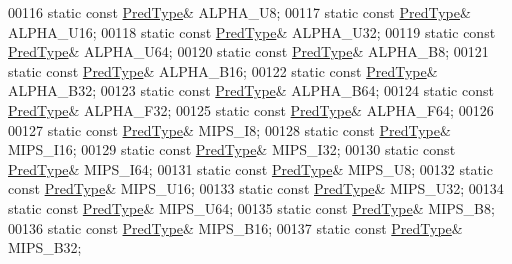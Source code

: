 \begin{DoxyCode}
00116         \textcolor{keyword}{static} \textcolor{keyword}{const} \hyperlink{class_h5_1_1_pred_type}{PredType}& ALPHA\_U8;
00117         \textcolor{keyword}{static} \textcolor{keyword}{const} \hyperlink{class_h5_1_1_pred_type}{PredType}& ALPHA\_U16;
00118         \textcolor{keyword}{static} \textcolor{keyword}{const} \hyperlink{class_h5_1_1_pred_type}{PredType}& ALPHA\_U32;
00119         \textcolor{keyword}{static} \textcolor{keyword}{const} \hyperlink{class_h5_1_1_pred_type}{PredType}& ALPHA\_U64;
00120         \textcolor{keyword}{static} \textcolor{keyword}{const} \hyperlink{class_h5_1_1_pred_type}{PredType}& ALPHA\_B8;
00121         \textcolor{keyword}{static} \textcolor{keyword}{const} \hyperlink{class_h5_1_1_pred_type}{PredType}& ALPHA\_B16;
00122         \textcolor{keyword}{static} \textcolor{keyword}{const} \hyperlink{class_h5_1_1_pred_type}{PredType}& ALPHA\_B32;
00123         \textcolor{keyword}{static} \textcolor{keyword}{const} \hyperlink{class_h5_1_1_pred_type}{PredType}& ALPHA\_B64;
00124         \textcolor{keyword}{static} \textcolor{keyword}{const} \hyperlink{class_h5_1_1_pred_type}{PredType}& ALPHA\_F32;
00125         \textcolor{keyword}{static} \textcolor{keyword}{const} \hyperlink{class_h5_1_1_pred_type}{PredType}& ALPHA\_F64;
00126 
00127         \textcolor{keyword}{static} \textcolor{keyword}{const} \hyperlink{class_h5_1_1_pred_type}{PredType}& MIPS\_I8;
00128         \textcolor{keyword}{static} \textcolor{keyword}{const} \hyperlink{class_h5_1_1_pred_type}{PredType}& MIPS\_I16;
00129         \textcolor{keyword}{static} \textcolor{keyword}{const} \hyperlink{class_h5_1_1_pred_type}{PredType}& MIPS\_I32;
00130         \textcolor{keyword}{static} \textcolor{keyword}{const} \hyperlink{class_h5_1_1_pred_type}{PredType}& MIPS\_I64;
00131         \textcolor{keyword}{static} \textcolor{keyword}{const} \hyperlink{class_h5_1_1_pred_type}{PredType}& MIPS\_U8;
00132         \textcolor{keyword}{static} \textcolor{keyword}{const} \hyperlink{class_h5_1_1_pred_type}{PredType}& MIPS\_U16;
00133         \textcolor{keyword}{static} \textcolor{keyword}{const} \hyperlink{class_h5_1_1_pred_type}{PredType}& MIPS\_U32;
00134         \textcolor{keyword}{static} \textcolor{keyword}{const} \hyperlink{class_h5_1_1_pred_type}{PredType}& MIPS\_U64;
00135         \textcolor{keyword}{static} \textcolor{keyword}{const} \hyperlink{class_h5_1_1_pred_type}{PredType}& MIPS\_B8;
00136         \textcolor{keyword}{static} \textcolor{keyword}{const} \hyperlink{class_h5_1_1_pred_type}{PredType}& MIPS\_B16;
00137         \textcolor{keyword}{static} \textcolor{keyword}{const} \hyperlink{class_h5_1_1_pred_type}{PredType}& MIPS\_B32;

\end{DoxyCode}
